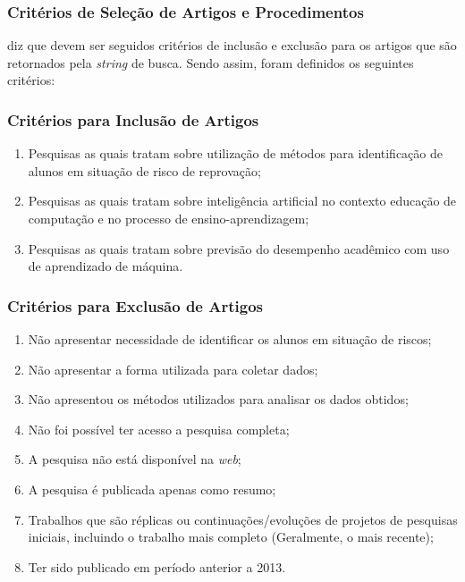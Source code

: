 \subsubsection{Critérios de Seleção de Artigos e Procedimentos}
 diz que devem ser seguidos critérios de inclusão e exclusão para os artigos que são retornados pela \textit{string} de busca. Sendo assim, foram definidos os seguintes critérios:

\subsubsection{Critérios para Inclusão de Artigos}

\begin{enumerate}
    \item Pesquisas as quais tratam sobre utilização de métodos para identificação de alunos em situação de risco de reprovação;
    \item Pesquisas as quais tratam sobre inteligência artificial no contexto educação de computação e no processo de ensino-aprendizagem;
    \item Pesquisas as quais tratam sobre previsão do desempenho acadêmico com uso de aprendizado de máquina.
\end{enumerate}

\subsubsection{Critérios para Exclusão de Artigos}
\begin{enumerate}
    \item Não apresentar necessidade de identificar os alunos em situação de riscos;
    \item Não apresentar a forma utilizada para coletar dados;
    \item Não apresentou os métodos utilizados para analisar os dados obtidos;
    \item Não foi possível ter acesso a pesquisa completa;
    \item A pesquisa não está disponível na \textit{web};
    \item A pesquisa é publicada apenas como resumo;
    \item Trabalhos que são réplicas ou continuações/evoluções de projetos de pesquisas iniciais, incluindo o trabalho mais completo (Geralmente, o mais recente);
    \item Ter sido publicado em período anterior a 2013.
\end{enumerate}

